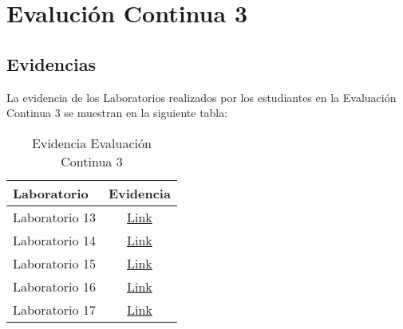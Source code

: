 \chapter{Evalución Continua 3}
\newpage


\pagestyle{empty} %

\section{Evidencias}
La evidencia de los Laboratorios realizados por los estudiantes en la Evaluación Continua 3 se muestran en la siguiente tabla:

\begin{table}[h]
\centering
\begin{tabular}{l|c}
\hline
\textbf{Laboratorio} & 
\textbf{Evidencia} 
\\ \hline
Laboratorio 13 &
\href{https://drive.google.com/open?id=1wf1JYBjRXWgXSmTPC1yh-Vwmh_7bvCQo}{Link}
\\ \hline
Laboratorio 14 &
\href{https://drive.google.com/open?id=1ZmvU_RQhxu7uSsHU1bps2T8AQKOeAMka}{Link}
\\ \hline
Laboratorio 15 &
\href{https://drive.google.com/open?id=1GIT186cLhKzYjattwLNzH22PFJAREFtB}{Link}
\\ \hline
Laboratorio 16 &
\href{https://drive.google.com/open?id=1dtU-LpoytWUJQM34eT7T9cMWn8t1C2E9}{Link}
\\ \hline
Laboratorio 17 &
\href{https://drive.google.com/open?id=14hhX-vWrLPGQpNpfeE0UX3LIlSS12fVe}{Link}
\\ \hline
\end{tabular}
\caption{Evidencia Evaluación Continua 3}
\label{tab:evidencia_evaluacion_continua_3} %
\end{table}


